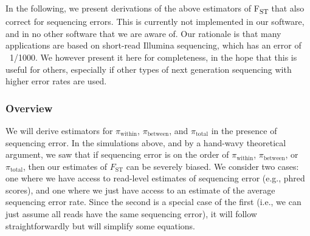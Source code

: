 \documentclass[a4paper,fontsize=9pt,DIV=14]{scrartcl}
\newcounter{todo}
\newcommand\todo[1]{}
\newcommand{\fst}{F\textsubscript{ST}}
\newcommand*{\piw}{$\pi_\text{within}$\xspace}
\newcommand*{\pib}{$\pi_\text{between}$\xspace}
\newcommand*{\pit}{$\pi_\text{total}$\xspace}
\begin{document}
In the following, we present derivations of the above estimators of \fst{} that also correct for sequencing errors. This is currently not implemented in our software, and in no other software that we are aware of. Our rationale is that many applications are based on short-read Illumina sequencing, which has an error of ~1/1000. We however present it here for completeness, in the hope that this is useful for others, especially if other types of next generation sequencing with higher error rates are used.

\todo{check whether this or something similar is implemented in poolfstat! it might be important to mention this here then!}

\todo{Jeff, do you think it would be worth showing the above bias plots here again, with the seq error correction? it might mean that we have to implement the equations though... not sure if needed now. JPS: I think that sequencing error rates are high enough and pi tends to be low enough that they could actually mess up Fst estimates in practice.  People would probably appreciate a corrected estimate of Fst, but it's also probably not super crucial.  I guess it depends on how hard it is to implement. LC: it's kind of a lot to implement... instead of just keeping counts or frequencies at each position, we'd have to keep track of each base with its respective quality score throughout the whole process... a lot of code refactoring! the average one could be done more easily though, I think.}


\subsubsection*{Overview}
\label{supp:sec:FST:sub:HeterozygositySequencingError:sub:Overview}

We will derive estimators for \piw, \pib, and \pit in the presence of sequencing error.  In the simulations above, and by a hand-wavy theoretical argument, we saw that if sequencing error is on the order of \piw, \pib, or \pit, then our estimates of $F_\text{ST}$ can be severely biased.  We consider two cases: one where we have access to read-level estimates of sequencing error (e.g., phred scores), and one where we just have access to an estimate of the average sequencing error rate.  Since the second is a special case of the first (i.e., we can just assume all reads have the same sequencing error), it will follow straightforwardly but will simplify some equations.
\end{document}
